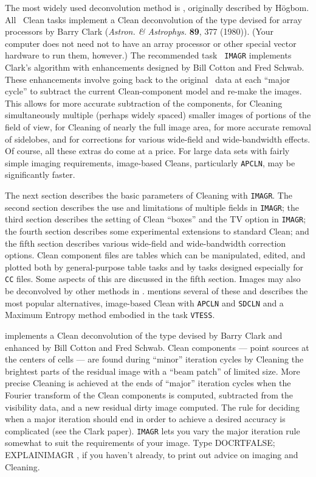 
     The most widely used deconvolution method is ,
originally described by H\"ogbom.  All \AIPS\ Clean tasks implement a
Clean deconvolution of the type devised for array processors by Barry
Clark ({\it Astron. \& Astrophys.\/} {\bf 89}, 377 (1980)).  (Your
computer does not need not to have an array processor or other special
vector hardware to run them, however.)  The recommended task {\tt
IMAGR} implements Clark's algorithm with enhancements designed by
Bill Cotton and Fred Schwab. 
  These enhancements involve going
back to the original \uv\ data at each ``major cycle'' to subtract the
current Clean-component model and re-make the images.  This allows for
more accurate subtraction of the components, for Cleaning
simultaneously multiple (perhaps widely spaced) smaller images of
portions of the field of view, for Cleaning of nearly the full image
area, for more accurate removal of sidelobes, and for corrections for
various wide-field and wide-bandwidth effects.  Of course, all these
extras do come at a price.  For large data sets with fairly simple
imaging requirements, image-based Cleans, particularly {\tt APCLN},
may be significantly faster.

     The next section describes the basic parameters of Cleaning with
{\tt IMAGR}\@.  The second section describes the use and limitations
of multiple fields in {\tt IMAGR}; the third section describes the
setting of Clean ``boxes'' and the TV option in {\tt IMAGR}; the
fourth section describes some experimental extensions to standard
Clean; and the fifth section describes various wide-field and
wide-bandwidth correction options.  Clean component files are tables
which can be manipulated, edited, and plotted both by general-purpose
table tasks and by tasks designed especially for {\tt CC} files.  Some
aspects of this are discussed in the fifth section. Images may also be
deconvolved by other methods in \AIPS\@.   mentions
several of these and describes the most popular alternatives,
image-based Clean with {\tt APCLN} and {\tt SDCLN} and a Maximum
Entropy method embodied in the task {\tt VTESS}\@.


     {\tt {}} implements a Clean deconvolution of the type
devised by Barry Clark and enhanced by Bill Cotton and Fred Schwab.
Clean components --- point sources at the centers of cells --- are
found during ``minor'' iteration cycles by Cleaning the brightest
parts of the residual image with a ``beam patch'' of limited size.
More precise Cleaning is achieved at the ends of ``major'' iteration
cycles when the Fourier transform of the Clean components is computed,
subtracted from the visibility data, and a new residual dirty image
computed.  The rule for deciding when a major iteration should end in
order to achieve a desired accuracy is complicated (see the Clark
paper).  {\tt IMAGR} lets you vary the major iteration rule somewhat
to suit the requirements of your image.  Type {\us DOCRT\qs FALSE;
EXPLAIN\qs IMAGR \CR}, if you haven't already, to print out advice on
imaging and Cleaning.

